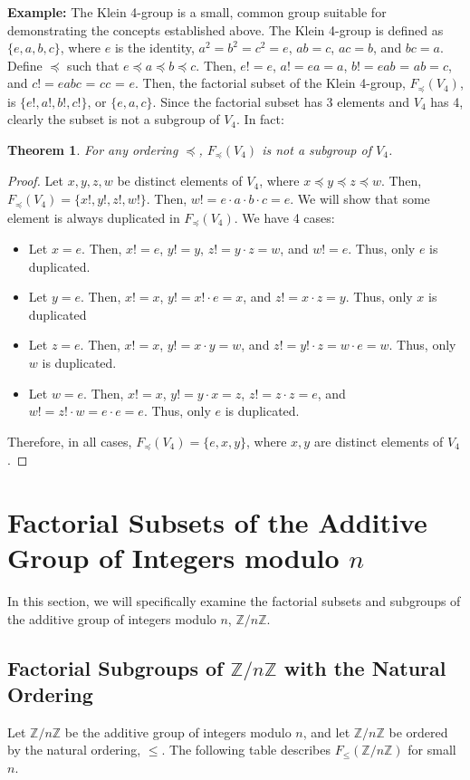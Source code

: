 \documentclass{article}
\newcommand{\ZZ}{\mathbb{Z}}
\newcommand{\ZnZ}{\ZZ/n\ZZ}
\newtheorem{theorem}{Theorem}
\begin{document}
\textbf{Example:} The Klein 4-group is a small, common group suitable for demonstrating the concepts established above. The Klein 4-group is defined as $\{e,a,b,c\}$, where $e$ is the identity, $a^2 = b^2 = c^2 = e$, $ab = c$, $ac = b$, and
$bc = a$. Define $\preceq$ such that $e\preceq a \preceq b \preceq c$. Then, $e! = e$, $a! = ea = a$, $b! = eab$ = $ab = c$, and $c! = eabc$ = $cc$ = $e$. Then, the factorial subset of the Klein 4-group, $F_\preceq(V_4)$, is $\{e!,a!,b!,c!\}$, or $\{e,a,c\}$. Since the factorial subset has 3 elements and $V_4$ has 4, clearly the subset is not a subgroup of $V_4$. In fact:
\begin{theorem}
For any ordering $\preceq$, $F_\preceq(V_4)$ is not a subgroup of $V_4$.
\end{theorem}
\begin{proof}
Let $x,y,z,w$ be distinct elements of $V_4$, where $x\preceq y \preceq z \preceq w$. Then, $F_\preceq(V_4) = \{x!,y!,z!,w!\}$. Then, $w! = e\cdot a\cdot b\cdot c = e$. We will show that some element is always duplicated in $F_\preceq(V_4)$. We have 4 cases:
\begin{itemize}
    \item[Case 1:] Let $x=e$. Then, $x! = e$, $y! = y$, $z! = y\cdot z = w$, and $w! = e$. Thus, only $e$ is duplicated. 
    \item[Case 2:] Let $y=e$. Then, $x!=x$, $y! = x!\cdot e = x$, and $z! = x\cdot z = y$. Thus, only $x$ is duplicated
    \item[Case 3:] Let $z=e$. Then, $x!=x$, $y!= x\cdot y = w$, and $z! = y!\cdot z = w\cdot e= w$. Thus, only $w$ is duplicated.
    \item[Case 4:] Let $w=e$. Then, $x!=x$, $y! = y\cdot x = z$,  $z! = z\cdot z = e$, and $w! = z! \cdot w = e\cdot e = e$. Thus, only $e$ is duplicated.
\end{itemize}
Therefore, in all cases, $F_\preceq(V_4) = \{e,x,y\}$, where $x,y$ are distinct elements of $V_4$. 
\end{proof}

\section{Factorial Subsets of the Additive Group of Integers modulo $n$}
In this section, we will specifically examine the factorial subsets and subgroups of the additive group of integers modulo $n$, $\mathbb{Z}/n\mathbb{Z}$. 
\subsection{Factorial Subgroups of $\ZnZ$ with the Natural Ordering}
Let $\ZnZ$ be the additive group of integers modulo $n$, and let $\ZnZ$ be ordered by the natural ordering, $\leq$.  The following table describes $F_\leq(\ZnZ)$ for small $n$. \\ \\
\end{document}
